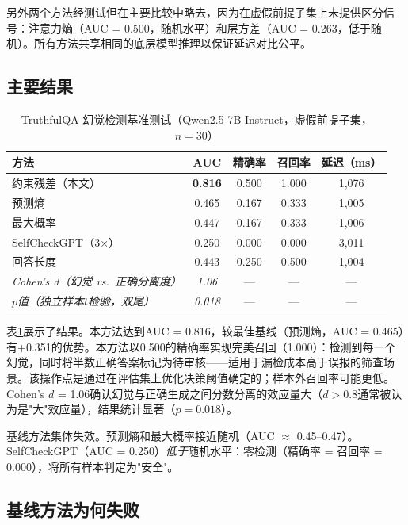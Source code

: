 \documentclass[11pt]{ctexart}
\begin{document}
另外两个方法经测试但在主要比较中略去，因为在虚假前提子集上未提供区分信号：注意力熵（AUC = 0.500，随机水平）和层方差（AUC = 0.263，低于随机）。所有方法共享相同的底层模型推理以保证延迟对比公平。

\subsection{主要结果}

\begin{table}[h]
\centering
\caption{TruthfulQA 幻觉检测基准测试（Qwen2.5-7B-Instruct，虚假前提子集，$n = 30$）}
\label{tab:benchmark}
\begin{tabular}{lcccc}
\toprule
\textbf{方法} & \textbf{AUC} & \textbf{精确率} & \textbf{召回率} & \textbf{延迟（ms）} \\
\midrule
约束残差（本文） & \textbf{0.816} & 0.500 & 1.000 & 1,076 \\
预测熵 & 0.465 & 0.167 & 0.333 & 1,005 \\
最大概率 & 0.447 & 0.167 & 0.333 & 1,006 \\
SelfCheckGPT（3×） & 0.250 & 0.000 & 0.000 & 3,011 \\
回答长度 & 0.443 & 0.250 & 0.500 & 1,004 \\
\midrule
\textit{Cohen's d（幻觉 vs.\ 正确分离度）} & \textit{1.06} & --- & --- & --- \\
\textit{$p$值（独立样本$t$检验，双尾）} & \textit{0.018} & --- & --- & --- \\
\bottomrule
\end{tabular}
\end{table}

表\ref{tab:benchmark}展示了结果。本方法达到AUC = 0.816，较最佳基线（预测熵，AUC = 0.465）有+0.351的优势。本方法以0.500的精确率实现完美召回（1.000）：检测到每一个幻觉，同时将半数正确答案标记为待审核——适用于漏检成本高于误报的筛查场景。该操作点是通过在评估集上优化决策阈值确定的；样本外召回率可能更低。Cohen's $d$ = 1.06确认幻觉与正确生成之间分数分离的效应量大（$d > 0.8$通常被认为是"大"效应量），结果统计显著（$p = 0.018$）。

基线方法集体失效。预测熵和最大概率接近随机（AUC $\approx$ 0.45--0.47）。SelfCheckGPT（AUC = 0.250）\textit{低于}随机水平：零检测（精确率 = 召回率 = 0.000），将所有样本判定为"安全"。

\subsection{基线方法为何失败}
\end{document}
